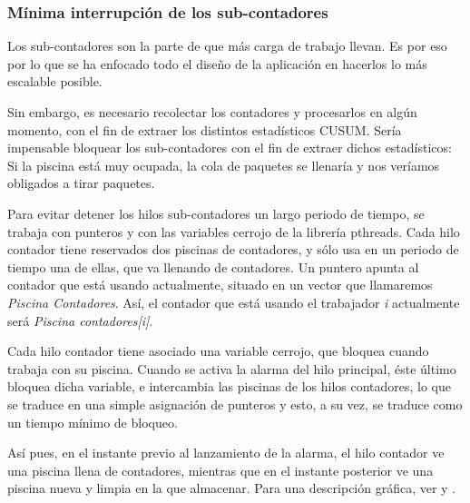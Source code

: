 \subsubsection{Mínima interrupción de los sub-contadores}
Los sub-contadores son la parte de \redborderddos que más carga de trabajo llevan. Es por eso por lo que se ha enfocado 
todo el diseño de la aplicación en hacerlos lo más escalable posible.

Sin embargo, es necesario recolectar los contadores y procesarlos en algún momento, con el fin de extraer los distintos 
estadísticos \gls{CUSUM}. Sería impensable bloquear los sub-contadores con el fin de extraer dichos estadísticos: Si la 
piscina está muy ocupada, la cola de paquetes se llenaría y nos veríamos obligados a tirar paquetes.

Para evitar detener los hilos sub-contadores un largo periodo de tiempo, se trabaja con punteros y con las variables 
cerrojo de la librería \gls{pthreads}. Cada hilo contador tiene reservados dos piscinas de 
contadores, y sólo usa en un periodo de tiempo una de ellas, que va llenando de contadores. Un puntero apunta al 
contador que está usando actualmente, situado en un vector que llamaremos \emph{Piscina Contadores}. Así, el contador 
que está usando el trabajador \emph{i} actualmente será \emph{Piscina contadores[i]}.

Cada hilo contador tiene asociado una variable cerrojo, que bloquea cuando trabaja con su 
piscina. Cuando se activa la alarma del hilo principal, éste último bloquea dicha variable, e intercambia las piscinas 
de los hilos contadores, lo que se traduce en una simple asignación de punteros y esto, a su vez, se traduce como un 
tiempo mínimo de bloqueo.

Así pues, en el instante previo al lanzamiento de la alarma, el hilo contador ve una piscina llena de contadores, 
mientras que en el instante posterior ve una piscina nueva y limpia en la que almacenar. Para una descripción 
gráfica, ver  y .


